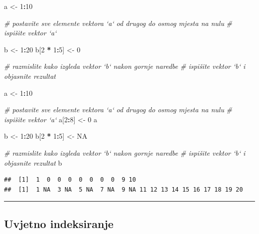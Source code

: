 \documentclass[]{book}
\newenvironment{Shaded}{\begin{snugshade}}{\end{snugshade}}
\newcommand{\DecValTok}[1]{\textcolor[rgb]{0.00,0.00,0.81}{#1}}
\newcommand{\StringTok}[1]{\textcolor[rgb]{0.31,0.60,0.02}{#1}}
\newcommand{\CommentTok}[1]{\textcolor[rgb]{0.56,0.35,0.01}{\textit{#1}}}
\newcommand{\OtherTok}[1]{\textcolor[rgb]{0.56,0.35,0.01}{#1}}
\newcommand{\OperatorTok}[1]{\textcolor[rgb]{0.81,0.36,0.00}{\textbf{#1}}}
\newcommand{\NormalTok}[1]{#1}
\theoremstyle{definition}
\theoremstyle{definition}
\theoremstyle{definition}
\theoremstyle{remark}
\begin{document}
\begin{Shaded}
\begin{Highlighting}[]
\NormalTok{a <-}\StringTok{ }\DecValTok{1}\OperatorTok{:}\DecValTok{10}

\CommentTok{# postavite sve elemente vektora `a` od drugog do osmog mjesta na nulu }
\CommentTok{# ispišite vektor `a`}

\NormalTok{b <-}\StringTok{ }\DecValTok{1}\OperatorTok{:}\DecValTok{20}
\NormalTok{b[}\DecValTok{2} \OperatorTok{*}\StringTok{ }\DecValTok{1}\OperatorTok{:}\DecValTok{5}\NormalTok{] <-}\StringTok{ }\DecValTok{0}

\CommentTok{# razmislite kako izgleda vektor `b` nakon gornje naredbe}
\CommentTok{# ispišite vektor `b` i objasnite rezultat}
\end{Highlighting}
\end{Shaded}

\begin{Shaded}
\begin{Highlighting}[]
\NormalTok{a <-}\StringTok{ }\DecValTok{1}\OperatorTok{:}\DecValTok{10}

\CommentTok{# postavite sve elemente vektora `a` od drugog do osmog mjesta na nulu }
\CommentTok{# ispišite vektor `a`}
\NormalTok{a[}\DecValTok{2}\OperatorTok{:}\DecValTok{8}\NormalTok{] <-}\StringTok{ }\DecValTok{0}
\NormalTok{a}

\NormalTok{b <-}\StringTok{ }\DecValTok{1}\OperatorTok{:}\DecValTok{20}
\NormalTok{b[}\DecValTok{2} \OperatorTok{*}\StringTok{ }\DecValTok{1}\OperatorTok{:}\DecValTok{5}\NormalTok{] <-}\StringTok{ }\OtherTok{NA}

\CommentTok{# razmislite kako izgleda vektor `b` nakon gornje naredbe}
\CommentTok{# ispišite vektor `b` i objasnite rezultat}
\NormalTok{b}
\end{Highlighting}
\end{Shaded}

\begin{verbatim}
##  [1]  1  0  0  0  0  0  0  0  9 10
##  [1]  1 NA  3 NA  5 NA  7 NA  9 NA 11 12 13 14 15 16 17 18 19 20
\end{verbatim}

\begin{center}\rule{0.5\linewidth}{\linethickness}\end{center}

\subsection{Uvjetno indeksiranje}\label{uvjetno-indeksiranje}
\end{document}
